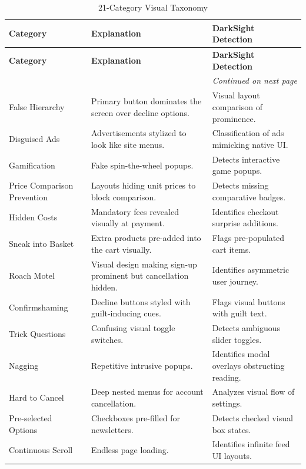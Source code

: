 \documentclass[12pt,a4paper]{article}
\begin{document}
\begin{longtable}{|p{}|p{}|p{}|}
\caption{21-Category Visual Taxonomy \cite{50shades}} \label{tab:vision_tax} \\
\hline
\textbf{Category} & \textbf{Explanation} & \textbf{DarkSight Detection} \\ \hline
\endfirsthead
\hline
\textbf{Category} & \textbf{Explanation} & \textbf{DarkSight Detection} \\ \hline
\endhead
\hline
\multicolumn{3}{|r|}{\textit{Continued on next page}} \\
\hline
\endfoot
\hline
\endlastfoot
False Hierarchy & Primary button dominates the screen over decline options. & Visual layout comparison of prominence. \\ \hline
Disguised Ads & Advertisements stylized to look like site menus. & Classification of ads mimicking native UI. \\ \hline
Gamification & Fake spin-the-wheel popups. & Detects interactive game popups. \\ \hline
Price Comparison Prevention & Layouts hiding unit prices to block comparison. & Detects missing comparative badges. \\ \hline
Hidden Costs & Mandatory fees revealed visually at payment. & Identifies checkout surprise additions. \\ \hline
Sneak into Basket & Extra products pre-added into the cart visually. & Flags pre-populated cart items. \\ \hline
Roach Motel & Visual design making sign-up prominent but cancellation hidden. & Identifies asymmetric user journey. \\ \hline
Confirmshaming & Decline buttons styled with guilt-inducing cues. & Flags visual buttons with guilt text. \\ \hline
Trick Questions & Confusing visual toggle switches. & Detects ambiguous slider toggles. \\ \hline
Nagging & Repetitive intrusive popups. & Identifies modal overlays obstructing reading. \\ \hline
Hard to Cancel & Deep nested menus for account cancellation. & Analyzes visual flow of settings. \\ \hline
Pre-selected Options & Checkboxes pre-filled for newsletters. & Detects checked visual box states. \\ \hline
Continuous Scroll & Endless page loading. & Identifies infinite feed UI layouts. \\ \hline

\end{longtable}
\end{document}
